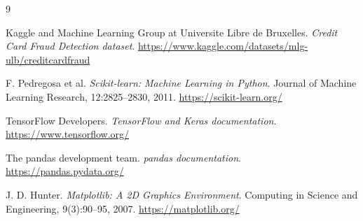 \documentclass[12pt,a4paper]{report}
\begin{document}
\begin{thebibliography}{9}

Kaggle and Machine Learning Group at Universite Libre de Bruxelles.
\textit{Credit Card Fraud Detection dataset}.
\url{https://www.kaggle.com/datasets/mlg-ulb/creditcardfraud}

F. Pedregosa et al.
\textit{Scikit-learn: Machine Learning in Python}.
Journal of Machine Learning Research, 12:2825--2830, 2011.
\url{https://scikit-learn.org/}

TensorFlow Developers.
\textit{TensorFlow and Keras documentation}.
\url{https://www.tensorflow.org/}

The pandas development team.
\textit{pandas documentation}.
\url{https://pandas.pydata.org/}

J. D. Hunter.
\textit{Matplotlib: A 2D Graphics Environment}.
Computing in Science and Engineering, 9(3):90--95, 2007.
\url{https://matplotlib.org/}

\end{thebibliography}
\end{document}
